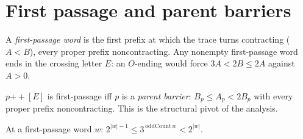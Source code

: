 \section{First passage and parent barriers}

\begin{theorem}
  \label{thm:collatz-last-E}
  \leanok
  A \emph{first-passage word} is the first prefix at which the trace turns contracting
  ($A<B$), every proper prefix noncontracting. Any nonempty first-passage word ends in the
  crossing letter $E$: an $O$-ending would force $3A<2B\le 2A$ against $A>0$.
\end{theorem}
\begin{theorem}
  \label{thm:collatz-firstpassage-iff}
  \leanok
  $p \mathbin{+\!\!+} [E]$ is first-passage iff $p$ is a \emph{parent barrier}:
  $B_p\le A_p<2B_p$ with every proper prefix noncontracting. This is the structural pivot of
  the analysis.
\end{theorem}
\begin{lemma}
  \label{lem:collatz-power-bounds}
  \leanok
  At a first-passage word $w$: $2^{|w|-1}\le 3^{\,\mathrm{oddCount}\,w}<2^{|w|}$.
\end{lemma}
